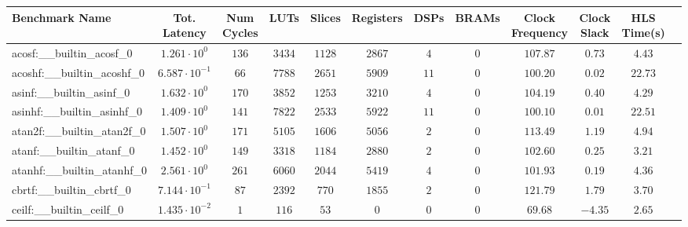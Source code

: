 \begin{tabular}{|l|c|c|c|c|c|c|c|c|c|c|c|}
\hline
Benchmark Name                            & Tot. Latency            & Num Cycles & LUTs       & Slices    & Registers & DSPs    & BRAMs & Clock Frequency & Clock Slack & HLS Time(s) \\
\hline
acosf:\_\_builtin\_acosf\_0               & $ 1.261 \cdot 10^{0}  $ & $ 136    $ & $ 3434   $ & $ 1128  $ & $ 2867  $ & $ 4   $ & $ 0 $ & $ 107.87      $ & $ 0.73    $ & $ 4.43    $ \\
acoshf:\_\_builtin\_acoshf\_0             & $ 6.587 \cdot 10^{-1} $ & $ 66     $ & $ 7788   $ & $ 2651  $ & $ 5909  $ & $ 11  $ & $ 0 $ & $ 100.20      $ & $ 0.02    $ & $ 22.73   $ \\
asinf:\_\_builtin\_asinf\_0               & $ 1.632 \cdot 10^{0}  $ & $ 170    $ & $ 3852   $ & $ 1253  $ & $ 3210  $ & $ 4   $ & $ 0 $ & $ 104.19      $ & $ 0.40    $ & $ 4.29    $ \\
asinhf:\_\_builtin\_asinhf\_0             & $ 1.409 \cdot 10^{0}  $ & $ 141    $ & $ 7822   $ & $ 2533  $ & $ 5922  $ & $ 11  $ & $ 0 $ & $ 100.10      $ & $ 0.01    $ & $ 22.51   $ \\
atan2f:\_\_builtin\_atan2f\_0             & $ 1.507 \cdot 10^{0}  $ & $ 171    $ & $ 5105   $ & $ 1606  $ & $ 5056  $ & $ 2   $ & $ 0 $ & $ 113.49      $ & $ 1.19    $ & $ 4.94    $ \\
atanf:\_\_builtin\_atanf\_0               & $ 1.452 \cdot 10^{0}  $ & $ 149    $ & $ 3318   $ & $ 1184  $ & $ 2880  $ & $ 2   $ & $ 0 $ & $ 102.60      $ & $ 0.25    $ & $ 3.21    $ \\
atanhf:\_\_builtin\_atanhf\_0             & $ 2.561 \cdot 10^{0}  $ & $ 261    $ & $ 6060   $ & $ 2044  $ & $ 5419  $ & $ 4   $ & $ 0 $ & $ 101.93      $ & $ 0.19    $ & $ 4.36    $ \\
cbrtf:\_\_builtin\_cbrtf\_0               & $ 7.144 \cdot 10^{-1} $ & $ 87     $ & $ 2392   $ & $ 770   $ & $ 1855  $ & $ 2   $ & $ 0 $ & $ 121.79      $ & $ 1.79    $ & $ 3.70    $ \\
ceilf:\_\_builtin\_ceilf\_0               & $ 1.435 \cdot 10^{-2} $ & $ 1      $ & $ 116    $ & $ 53    $ & $ 0     $ & $ 0   $ & $ 0 $ & $ 69.68       $ & $ -4.35   $ & $ 2.65    $ \\

\end{tabular}
